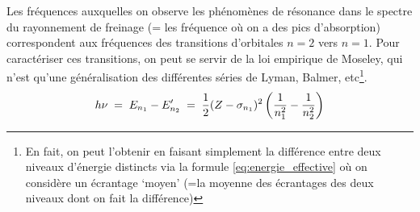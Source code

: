 Les fréquences auxquelles on observe les phénomènes de résonance dans le spectre du rayonnement de freinage (= les fréquence où on a des pics d'absorption) correspondent aux fréquences des transitions d'orbitales $n = 2$ vers $n = 1$. Pour caractériser ces transitions, on peut se servir de la loi empirique de Moseley, qui n'est qu'une généralisation des différentes séries de Lyman, Balmer, etc\footnote{En fait, on peut l'obtenir en faisant simplement la différence entre deux niveaux d'énergie distincts via la formule \ref{eq:energie_effective} où on considère un écrantage `moyen' (=la moyenne des écrantages des deux niveaux dont on fait la différence)}.
\begin{equation}
    h\nu
    \; = \; E_{n_1} - E'_{n_2}
    \; = \; \dfrac{1}{2}(Z-\sigma_{n_1})^2\left(\dfrac{1}{n_1^2}-\dfrac{1}{n_2^2}\right)
    \label{eq:Moseley}
\end{equation}

